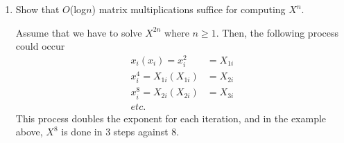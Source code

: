 \documentclass{article}
\begin{document}
\begin{enumerate}[label=(\alph*)]
\item Show that $O$(log$n$) matrix multiplications suffice for computing $X^n$.

Assume that we have to solve \(X^{2n}\) where $n \geq 1$. Then, the following process could occur
\begin{align}
	x_i(x_i) = x_i^2 &= X_{1i} \\
    x_i^4 = X_{1i}(X_{1i}) &= X_{2i} \\
    x_i^8 = X_{2i}(X_{2i}) &= X_{3i} \\
    etc.
  \end{align}
This process doubles the exponent for each iteration, and in the example above, $X^8$ is done in 3 steps against 8.
\end{enumerate}
\end{document}
